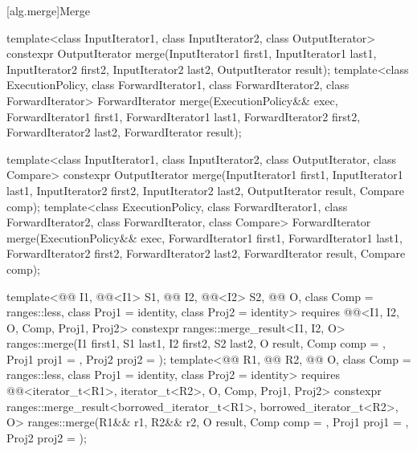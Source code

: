 [alg.merge]{Merge}

%
\begin{itemdecl}
template<class InputIterator1, class InputIterator2,
         class OutputIterator>
  constexpr OutputIterator
    merge(InputIterator1 first1, InputIterator1 last1,
          InputIterator2 first2, InputIterator2 last2,
          OutputIterator result);
template<class ExecutionPolicy, class ForwardIterator1, class ForwardIterator2,
         class ForwardIterator>
  ForwardIterator
    merge(ExecutionPolicy&& exec,
          ForwardIterator1 first1, ForwardIterator1 last1,
          ForwardIterator2 first2, ForwardIterator2 last2,
          ForwardIterator result);

template<class InputIterator1, class InputIterator2,
         class OutputIterator, class Compare>
  constexpr OutputIterator
    merge(InputIterator1 first1, InputIterator1 last1,
          InputIterator2 first2, InputIterator2 last2,
          OutputIterator result, Compare comp);
template<class ExecutionPolicy, class ForwardIterator1, class ForwardIterator2,
         class ForwardIterator, class Compare>
  ForwardIterator
    merge(ExecutionPolicy&& exec,
          ForwardIterator1 first1, ForwardIterator1 last1,
          ForwardIterator2 first2, ForwardIterator2 last2,
          ForwardIterator result, Compare comp);

template<@@ I1, @@<I1> S1, @@ I2, @@<I2> S2,
         @@ O, class Comp = ranges::less, class Proj1 = identity,
         class Proj2 = identity>
  requires @@<I1, I2, O, Comp, Proj1, Proj2>
  constexpr ranges::merge_result<I1, I2, O>
    ranges::merge(I1 first1, S1 last1, I2 first2, S2 last2, O result,
                  Comp comp = {}, Proj1 proj1 = {}, Proj2 proj2 = {});
template<@@ R1, @@ R2, @@ O, class Comp = ranges::less,
         class Proj1 = identity, class Proj2 = identity>
  requires @@<iterator_t<R1>, iterator_t<R2>, O, Comp, Proj1, Proj2>
  constexpr ranges::merge_result<borrowed_iterator_t<R1>, borrowed_iterator_t<R2>, O>
    ranges::merge(R1&& r1, R2&& r2, O result,
                  Comp comp = {}, Proj1 proj1 = {}, Proj2 proj2 = {});


\end{itemdecl}
